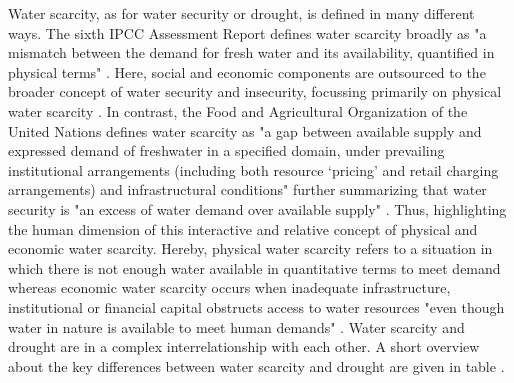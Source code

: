 {Water scarcity, as for water security or drought, is defined in many different ways. The sixth IPCC Assessment Report defines water scarcity broadly as "a mismatch between the demand for fresh water and its availability, quantified in physical terms" \autocite[560]{caretta2022water}. Here, social and economic components are outsourced to the broader concept of water security and insecurity, focussing primarily on physical water scarcity \autocite{caretta2022water}. In contrast, the Food and Agricultural Organization of the United Nations defines water scarcity as "a gap between available supply and expressed demand of freshwater in a specified domain, under prevailing institutional arrangements (including both resource ‘pricing’ and retail charging arrangements) and infrastructural conditions" \autocite[5]{faoCopingWaterScarcity2012} further summarizing that water security is "an excess of water demand over available supply" \autocite[6]{faoCopingWaterScarcity2012}. Thus, highlighting the human dimension of this interactive and relative concept of physical and economic water scarcity. Hereby, physical water scarcity refers to a situation in which there is not enough water available in quantitative terms to meet demand whereas economic water scarcity occurs when inadequate infrastructure, institutional or financial capital obstructs access to water resources "even though water in nature is available to meet human demands" \autocites{idmpDroughtWaterScarcity2022}[11]{moldenWaterFoodWater2007}.
Water scarcity and drought are in a complex interrelationship with each other. A short overview about the key differences between water scarcity and drought are given in table . 




}
